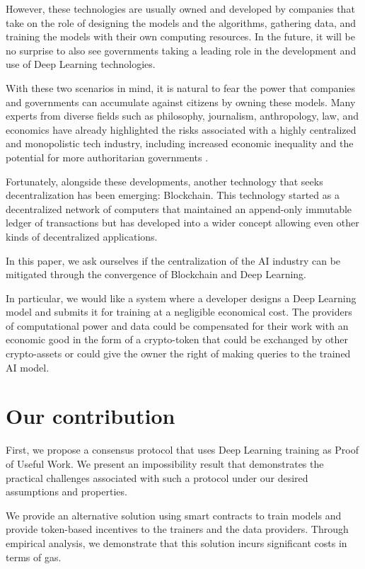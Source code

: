\documentclass[conference]{IEEEtran}
\begin{document}
However, these technologies are usually owned and developed by companies that take on the role of designing the models and the algorithms, gathering data, and training the models with their own computing resources. In the future, it will be no surprise to also see governments taking a leading role in the development and use of Deep Learning technologies.

With these two scenarios in mind, it is natural to fear the power that companies and governments can accumulate against citizens by owning these models. Many experts from diverse fields such as philosophy, journalism, anthropology, law, and economics have already highlighted the risks associated with a highly centralized and monopolistic tech industry, including increased economic inequality and the potential for more authoritarian governments  \cite{b1} \cite{b2} \cite{b3} \cite{b4}.

Fortunately, alongside these developments, another technology that seeks decentralization has been emerging: Blockchain. This technology started as a decentralized network of computers that maintained an append-only immutable ledger of transactions \cite{b6} but has developed into a wider concept allowing even other kinds of decentralized applications.

In this paper, we ask ourselves if the centralization of the AI industry can be mitigated through the convergence of Blockchain and Deep Learning.

In particular, we would like a system where a developer designs a Deep Learning model and submits it for training at a negligible economical cost. The providers of computational power and data could be compensated for their work with an economic good in the form of a crypto-token that could be exchanged by other crypto-assets or could give the owner the right of making queries to the trained AI model.

\section{Our contribution}
First, we propose a consensus protocol that uses Deep Learning training as Proof of Useful Work. We present an impossibility result that demonstrates the practical challenges associated with such a protocol under our desired assumptions and properties.

We provide an alternative solution using smart contracts to train models and provide token-based incentives to the trainers and the data providers. Through empirical analysis, we demonstrate that this solution incurs significant costs in terms of gas.
\end{document}
